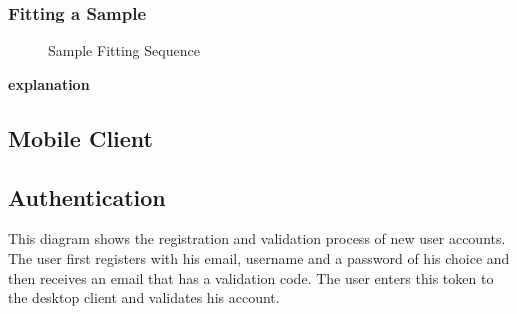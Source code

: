 \subsubsection{Fitting a Sample}
\begin{figure}[!htb]
    \centering
    \caption{Sample Fitting Sequence}
    \label{fig:seq-fitting-a-sample}
\end{figure}

\textbf{explanation}
\newpage

\subsection{Mobile Client}

\subsection{Authentication}

This diagram shows the registration and validation process of new user accounts. The user first registers with his email, username and a password of his choice and then receives an email that has a validation code. The user enters this token to the desktop client and validates his account.
